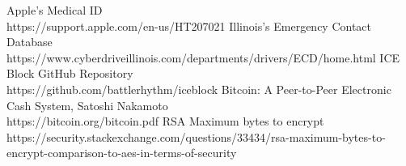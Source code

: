 \documentclass[conference]{IEEEtran}
\begin{document}
\begin{thebibliography}{00}
     Apple's Medical ID\\
    https://support.apple.com/en-us/HT207021
     Illinois's Emergency Contact Database\\
    https://www.cyberdriveillinois.com/departments/drivers/ECD/home.html
     ICE Block GitHub Repository\\
    https://github.com/battlerhythm/iceblock
     Bitcoin: A Peer-to-Peer Electronic Cash System, Satoshi Nakamoto \\
    https://bitcoin.org/bitcoin.pdf
     RSA Maximum bytes to encrypt\\
    https://security.stackexchange.com/questions/33434/rsa-maximum-bytes-to-encrypt-comparison-to-aes-in-terms-of-security



\end{thebibliography}
\end{document}
